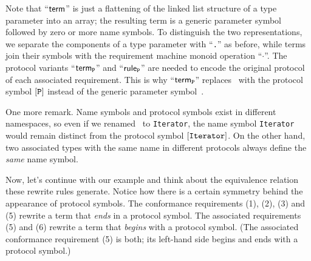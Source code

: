 \documentclass[../generics]{subfiles}
\begin{document}
\begin{example}
Note that ``$\mathsf{term}$'' is just a flattening of the linked list structure of a type parameter into an array; the resulting term is a generic parameter symbol followed by zero or more name symbols. To distinguish the two representations, we separate the components of a type parameter with ``\texttt{.}'' as before, while terms join their symbols with the requirement machine \index{$\cdot$}monoid operation ``\;$\cdot$\;''. The protocol variants ``$\mathsf{term}_{\texttt{P}}$'' and ``$\mathsf{rule}_{\texttt{P}}$'' are needed to encode the original protocol of each associated requirement. This is why ``$\mathsf{term}_{\texttt{P}}$'' replaces \IndexSelf\tSelf\ with the protocol symbol $[\texttt{P}]$ instead of the generic parameter symbol~\rT.

One more remark. Name symbols and protocol symbols exist in different namespaces, so even if we renamed \tIterator\ to \texttt{Iterator}, the name symbol \texttt{Iterator} would remain distinct from the protocol symbol $[\texttt{Iterator}]$. On the other hand, two associated types with the same name in different protocols always define the \emph{same} name symbol.

Now, let's continue with our example and think about the equivalence relation these rewrite rules generate. Notice how there is a certain symmetry behind the appearance of protocol symbols. The conformance requirements (1), (2), (3) and (5) rewrite a term that \emph{ends} in a protocol symbol. The associated requirements (5) and (6) rewrite a term that \emph{begins} with a protocol symbol. (The associated conformance requirement (5) is both; its left-hand side begins and ends with a protocol symbol.)


\end{example}
\end{document}
